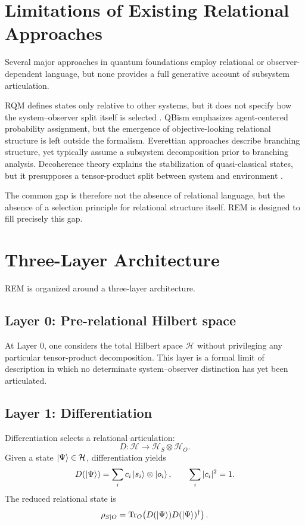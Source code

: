\documentclass[11pt]{article}
\begin{document}
\section{Limitations of Existing Relational Approaches}
Several major approaches in quantum foundations employ relational or observer-dependent language, but none provides a full generative account of subsystem articulation.

RQM defines states only relative to other systems, but it does not specify how the system--observer split itself is selected \cite{rovelli1996}. QBism emphasizes agent-centered probability assignment, but the emergence of objective-looking relational structure is left outside the formalism. Everettian approaches describe branching structure, yet typically assume a subsystem decomposition prior to branching analysis. Decoherence theory explains the stabilization of quasi-classical states, but it presupposes a tensor-product split between system and environment \cite{zurek2003}.

The common gap is therefore not the absence of relational language, but the absence of a selection principle for relational structure itself. REM is designed to fill precisely this gap.

\section{Three-Layer Architecture}
REM is organized around a three-layer architecture.

\subsection{Layer 0: Pre-relational Hilbert space}
At Layer 0, one considers the total Hilbert space $\mathcal{H}$ without privileging any particular tensor-product decomposition. This layer is a formal limit of description in which no determinate system--observer distinction has yet been articulated.

\subsection{Layer 1: Differentiation}
Differentiation selects a relational articulation:
\[
D:\mathcal{H}\rightarrow\mathcal{H}_S\otimes\mathcal{H}_O.
\]
Given a state $\ket{\Psi}\in\mathcal{H}$, differentiation yields
\[
D(\ket{\Psi})=\sum_i c_i \ket{s_i}\otimes \ket{o_i},\qquad \sum_i |c_i|^2=1.
\]
The reduced relational state is
\[
\rho_{S|O}=\Tr_O\!\left(D(\ket{\Psi})D(\ket{\Psi})^\dagger\right).
\]
\end{document}
